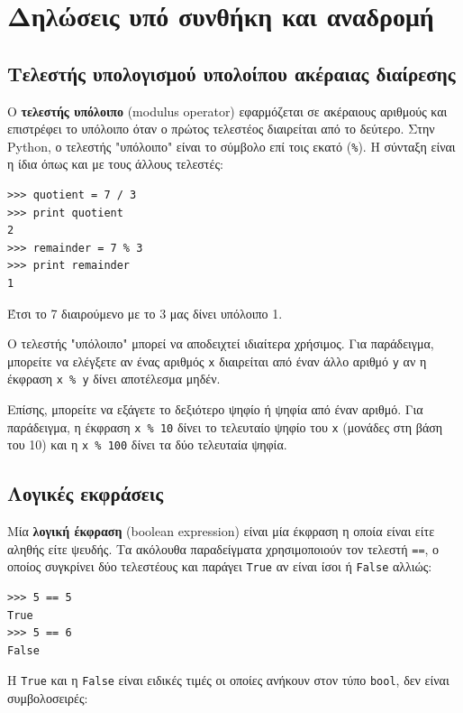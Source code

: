 \documentclass[10pt]{book}
\begin{document}
\chapter{Δηλώσεις υπό συνθήκη και αναδρομή}

\section{Τελεστής υπολογισμού υπολοίπου ακέραιας διαίρεσης}

Ο {\bf τελεστής υπόλοιπο} (modulus operator) εφαρμόζεται σε ακέραιους αριθμούς και επιστρέφει το υπόλοιπο όταν ο πρώτος τελεστέος διαιρείται από το δεύτερο. Στην Python, ο τελεστής  "υπόλοιπο" είναι το σύμβολο επί τοις εκατό (\verb"%").  Η σύνταξη είναι η ίδια όπως και με τους άλλους τελεστές:

\begin{verbatim}
>>> quotient = 7 / 3
>>> print quotient
2
>>> remainder = 7 % 3
>>> print remainder
1
\end{verbatim}
%

Έτσι το 7 διαιρούμενο με το 3 μας δίνει υπόλοιπο 1.

Ο τελεστής "υπόλοιπο" μπορεί να αποδειχτεί ιδιαίτερα χρήσιμος. Για παράδειγμα, μπορείτε να ελέγξετε αν ένας αριθμός {\tt x} διαιρείται από έναν άλλο αριθμό {\tt y} αν η έκφραση {\tt x \% y} δίνει αποτέλεσμα μηδέν.


Επίσης, μπορείτε να εξάγετε το δεξιότερο ψηφίο ή ψηφία από έναν αριθμό. Για παράδειγμα, η έκφραση {\tt x \% 10} δίνει το τελευταίο ψηφίο του {\tt x} (μονάδες στη βάση του 10) και η {\tt x \% 100} δίνει τα δύο
τελευταία ψηφία.


\section{Λογικές εκφράσεις}

Μία {\bf λογική έκφραση} (boolean expression) είναι μία έκφραση η οποία είναι είτε αληθής είτε ψευδής. Τα ακόλουθα παραδείγματα χρησιμοποιούν τον τελεστή {\tt ==}, ο οποίος συγκρίνει δύο τελεστέους και παράγει  {\tt True} αν είναι ίσοι ή {\tt False} αλλιώς:

\begin{verbatim}
>>> 5 == 5
True
>>> 5 == 6
False
\end{verbatim}
%

Η {\tt True} και η {\tt False} είναι ειδικές τιμές οι οποίες ανήκουν στον τύπο {\tt bool}, δεν είναι συμβολοσειρές:
\end{document}
